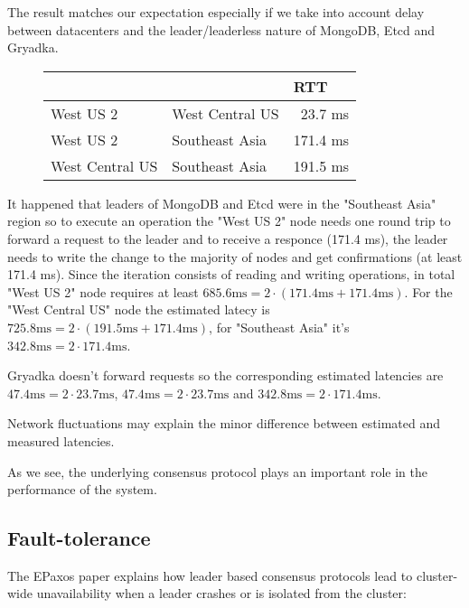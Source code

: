 \documentclass[12pt]{article}
\theoremstyle{definition}
\begin{document}
The result matches our expectation especially if we take into account delay between datacenters and the leader/leaderless nature of MongoDB, Etcd and Gryadka.

\begin{figure}[!h]
  \centering
  \begin{tabular}{llr|}
  \cline{3-3}
  & & \multicolumn{1}{|l|}{RTT} \\
  \hline
  \multicolumn{1}{|l|}{West US 2} & \multicolumn{1}{|l|}{West Central US} & 23.7 ms\\
  \hline
  \multicolumn{1}{|l|}{West US 2} & \multicolumn{1}{|l|}{Southeast Asia} & 171.4 ms\\
  \hline
  \multicolumn{1}{|l|}{West Central US} & \multicolumn{1}{|l|}{Southeast Asia} & 191.5 ms\\
  \hline
  \end{tabular}
\end{figure}

It happened that leaders of MongoDB and Etcd were in the "Southeast Asia" region so to execute an operation the "West US 2" node needs one round trip to forward a request to the leader and to receive a responce (171.4 ms), the leader needs to write the change to the majority of nodes and get confirmations (at least 171.4 ms). Since the iteration consists of reading and writing operations, in total "West US 2" node requires at least $685.6 \mbox{ms} = 2 \cdot (171.4 \mbox{ms} + 171.4 \mbox{ms})$. For the "West Central US" node the estimated latecy is $725.8 \mbox{ms} = 2 \cdot (191.5 \mbox{ms} + 171.4 \mbox{ms})$, for "Southeast Asia" it's $342.8 \mbox{ms} = 2 \cdot 171.4 \mbox{ms}$.

Gryadka doesn't forward requests so the corresponding estimated latencies are $47.4 \mbox{ms} = 2 \cdot 23.7 \mbox{ms}$, $47.4 \mbox{ms} = 2 \cdot 23.7 \mbox{ms}$ and $342.8 \mbox{ms} = 2 \cdot 171.4 \mbox{ms}$.

Network fluctuations may explain the minor difference between estimated and measured latencies.

As we see, the underlying consensus protocol plays an important role in the performance of the system.

\subsection{Fault-tolerance}

The EPaxos paper explains how leader based consensus protocols lead to cluster-wide unavailability when a leader crashes or is isolated from the cluster:
\end{document}
